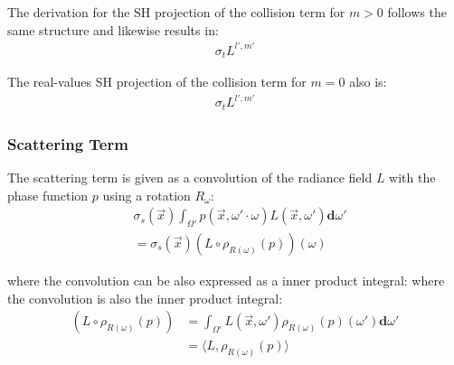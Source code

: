 \documentclass[10pt]{scrartcl}
\begin{document}
The derivation for the SH projection of the collision term for $m>0$ follows the same structure and likewise results in:
\begin{align}
\sigma_t L^{l',m'}
\end{align}

The real-values SH projection of the collision term for $m=0$ also is:
\begin{align}
\sigma_t L^{l',m'}
\end{align}


\subsubsection{Scattering Term}

The scattering term is given as a convolution of the radiance field $L$ with the phase function $p$ using a rotation $R_\omega$:
\begin{align*}
&
\sigma_s(\vec{x})\int_{\Omega'}p(\vec{x}, \omega'\cdot\omega)L(\vec{x}, \omega')\mathbf{d}\omega'
\\
&= \sigma_s(\vec{x})(L\circ \rho_{R(\omega)}(p))(\omega)
\end{align*}

where the convolution can be also expressed as a inner product integral:
where the convolution is also the inner product integral:
\begin{align*}
(L\circ \rho_{R(\omega)}(p)) &= \int_{\Omega'}{L(\vec{x}, \omega')\rho_{R(\omega)}(p)(\omega')\mathbf{d}\omega'} \\
&= \langle L,  \rho_{R(\omega)}(p)\rangle
\end{align*}
\end{document}
